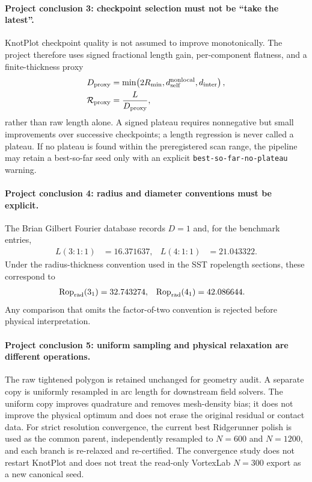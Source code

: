 \documentclass[11pt]{article}
\theoremstyle{definition}
\theoremstyle{plain}
\theoremstyle{remark}
\begin{document}
\paragraph{Project conclusion 3: checkpoint selection must not be ``take the latest''.}
KnotPlot checkpoint quality is not assumed to improve monotonically.  The
project therefore uses signed fractional length gain, per-component flatness,
and a finite-thickness proxy
\begin{align}
    D_{\rm proxy}
    &=
    \min\!\left(2R_{\min},d_{\rm self}^{\rm nonlocal},d_{\rm inter}\right),
    \\
    \mathcal R_{\rm proxy}
    &=
    \frac{L}{D_{\rm proxy}},
    \label{eq:genesis_knotplot_seed_proxy}
\end{align}
rather than raw length alone.  A signed plateau requires nonnegative but small
improvements over successive checkpoints; a length regression is never called
a plateau.  If no plateau is found within the preregistered scan range, the
pipeline may retain a best-so-far seed only with an explicit
\texttt{best-so-far-no-plateau} warning.

\paragraph{Project conclusion 4: radius and diameter conventions must be explicit.}
The Brian Gilbert Fourier database records $D=1$ and, for the benchmark entries,
\begin{align}
    L(3{:}1{:}1)&=16.371637,
    &
    L(4{:}1{:}1)&=21.043322.
    \label{eq:genesis_gilbert_length_benchmarks}
\end{align}
Under the radius-thickness convention used in the SST ropelength sections,
these correspond to
\begin{align}
    \operatorname{Rop}_{\rm rad}(3_1)&=32.743274,
    &
    \operatorname{Rop}_{\rm rad}(4_1)&=42.086644.
    \label{eq:genesis_gilbert_rop_benchmarks}
\end{align}
Any comparison that omits the factor-of-two convention is rejected before
physical interpretation.

\paragraph{Project conclusion 5: uniform sampling and physical relaxation are different operations.}
The raw tightened polygon is retained unchanged for geometry audit.  A separate
copy is uniformly resampled in arc length for downstream field solvers.  The
uniform copy improves quadrature and removes mesh-density bias; it does not
improve the physical optimum and does not erase the original residual or
contact data.  For strict resolution convergence, the current best Ridgerunner
polish is used as the common parent, independently resampled to $N=600$ and
$N=1200$, and each branch is re-relaxed and re-certified.  The convergence
study does not restart KnotPlot and does not treat the read-only VortexLab
$N=300$ export as a new canonical seed.
\end{document}
